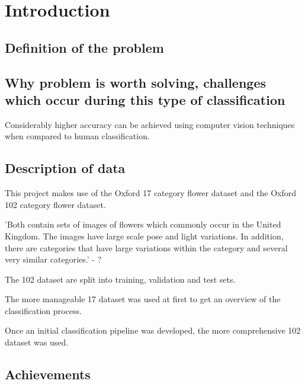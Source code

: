 \documentclass[11pt, a4paper]{report}
\begin{document}
\setlength{\parskip}{0.0cm}
\tableofcontents
\setlength{\parskip}{0.4cm}


\chapter{Introduction}

\section{Definition of the problem} 

\section{Why problem is worth solving, challenges which occur during this type of classification}

Considerably higher accuracy can be achieved using computer vision techniques when compared to human classification. 

\section{Description of data}

This project makes use of the Oxford 17 category flower dataset and the Oxford 102 category flower dataset. 

'Both contain sets of images of flowers which commonly occur in the United Kingdom. The images have large scale pose and light variations. In addition, there are categories that have large variations within the category and several very similar categories.' - ?

The 102 dataset are split into training, validation and test sets.

The more manageable 17 dataset was used at first to get an overview of the classification process.

Once an initial classification pipeline was developed, the more comprehensive 102 dataset was used. 

\section{Achievements}






\end{document}
